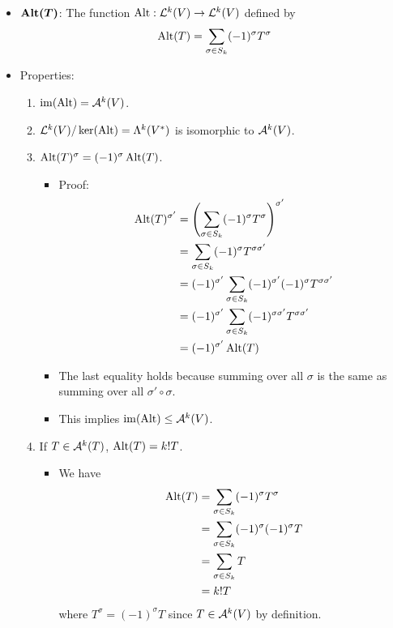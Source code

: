 \documentclass[../notes.tex]{subfiles}
\begin{document}
\begin{itemize}
    \item $\bm{\Alt(T)}$: The function $\Alt:\lin[k]{V}\to\lin[k]{V}$ defined by
    \begin{equation*}
        \Alt(T) = \sum_{\sigma\in S_k}(-1)^\sigma T^\sigma
    \end{equation*}
    \item Properties:
    \begin{enumerate}
        \item $\im(\Alt)=\alt[k]{V}$.
        \item $\lin[k]{V}/\ker(\Alt)=\lam[k]{V^*}$ is isomorphic to $\alt[k]{V}$.
        \item $\Alt(T)^\sigma=(-1)^\sigma\Alt(T)$.
        \begin{itemize}
            \item Proof:
            \begin{align*}
                \Alt(T)^{\sigma'} &= \left( \sum_{\sigma\in S_k}(-1)^\sigma T^\sigma \right)^{\sigma'}\\
                &= \sum_{\sigma\in S_k}(-1)^\sigma T^{\sigma\sigma'}\\
                &= (-1)^{\sigma'}\sum_{\sigma\in S_k}(-1)^{\sigma'}(-1)^\sigma T^{\sigma\sigma'}\\
                &= (-1)^{\sigma'}\sum_{\sigma\in S_k}(-1)^{\sigma\sigma'}T^{\sigma\sigma'}\\
                &= (-1)^{\sigma'}\Alt(T)
            \end{align*}
            \item The last equality holds because summing over all $\sigma$ is the same as summing over all $\sigma'\circ\sigma$.
            \item This implies $\im(\Alt)\leq\alt[k]{V}$.
        \end{itemize}
        \item If $T\in\alt[k]{T}$, $\Alt(T)=k!T$.
        \begin{itemize}
            \item We have
            \begin{align*}
                \Alt(T) &= \sum_{\sigma\in S_k}(-1)^\sigma T^\sigma\\
                &= \sum_{\sigma\in S_k}(-1)^\sigma(-1)^\sigma T\\
                &= \sum_{\sigma\in S_k}T\\
                &= k!T
            \end{align*}
            where $T^\sigma=(-1)^\sigma T$ since $T\in\alt[k]{V}$ by definition.

\end{itemize}
\end{enumerate}
\end{itemize}
\end{document}
